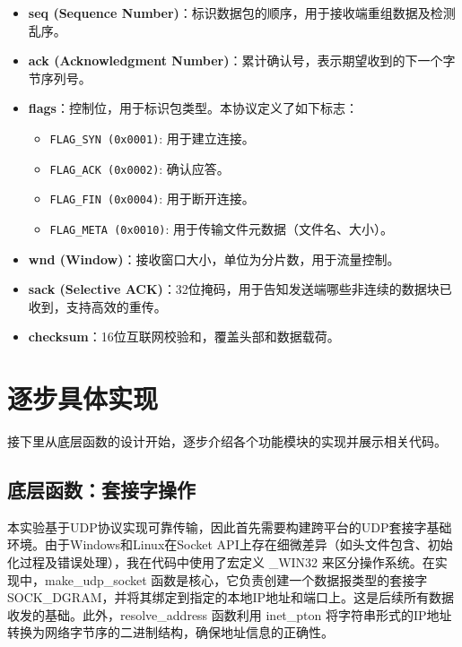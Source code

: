 \documentclass[a4paper]{article}
\begin{document}
	\begin{itemize}
		\item \textbf{seq (Sequence Number)}：标识数据包的顺序，用于接收端重组数据及检测乱序。
		\item \textbf{ack (Acknowledgment Number)}：累计确认号，表示期望收到的下一个字节序列号。
		\item \textbf{flags}：控制位，用于标识包类型。本协议定义了如下标志：
		\begin{itemize}
			\item \texttt{FLAG\_SYN (0x0001)}: 用于建立连接。
			\item \texttt{FLAG\_ACK (0x0002)}: 确认应答。
			\item \texttt{FLAG\_FIN (0x0004)}: 用于断开连接。
			\item \texttt{FLAG\_META (0x0010)}: 用于传输文件元数据（文件名、大小）。
		\end{itemize}
		\item \textbf{wnd (Window)}：接收窗口大小，单位为分片数，用于流量控制。
		\item \textbf{sack (Selective ACK)}：32位掩码，用于告知发送端哪些非连续的数据块已收到，支持高效的重传。
		\item \textbf{checksum}：16位互联网校验和，覆盖头部和数据载荷。
	\end{itemize}
	
	\section{逐步具体实现}
	接下里从底层函数的设计开始，逐步介绍各个功能模块的实现并展示相关代码。
	
	\subsection{底层函数：套接字操作}
	本实验基于UDP协议实现可靠传输，因此首先需要构建跨平台的UDP套接字基础环境。由于Windows和Linux在Socket API上存在细微差异（如头文件包含、初始化过程及错误处理），我在代码中使用了宏定义 \_WIN32 来区分操作系统。在实现中，make\_udp\_socket 函数是核心，它负责创建一个数据报类型的套接字 SOCK\_DGRAM，并将其绑定到指定的本地IP地址和端口上。这是后续所有数据收发的基础。此外，resolve\_address 函数利用 inet\_pton 将字符串形式的IP地址转换为网络字节序的二进制结构，确保地址信息的正确性。
\end{document}
